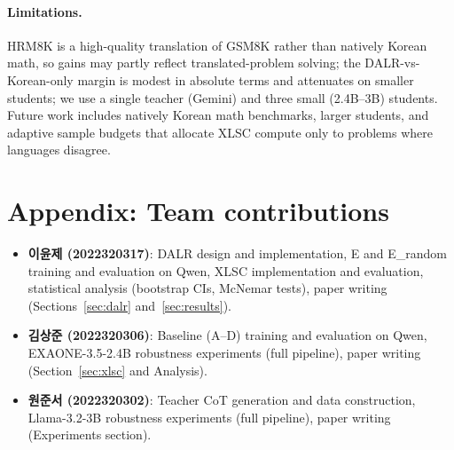 \documentclass{article}
\begin{document}
\paragraph{Limitations.} HRM8K is a high-quality translation of
GSM8K rather than natively Korean math, so gains may partly reflect
translated-problem solving; the DALR-vs-Korean-only margin is
modest in absolute terms and attenuates on smaller students; we use
a single teacher (Gemini) and three small (2.4B--3B) students.
Future work includes natively Korean math benchmarks, larger
students, and adaptive sample budgets that allocate XLSC compute
only to problems where languages disagree.




\newpage
\appendix

\section*{Appendix: Team contributions}
\begin{itemize}
  \item \textbf{이윤제 (2022320317)}: DALR design and implementation,
  E and E\_random training and evaluation on Qwen, XLSC implementation
  and evaluation, statistical analysis (bootstrap CIs, McNemar tests),
  paper writing (Sections~\ref{sec:dalr} and~\ref{sec:results}).
  \item \textbf{김상준 (2022320306)}: Baseline (A--D) training and
  evaluation on Qwen, EXAONE-3.5-2.4B robustness experiments (full
  pipeline), paper writing (Section~\ref{sec:xlsc} and Analysis).
  \item \textbf{원준서 (2022320302)}: Teacher CoT generation and data
  construction, Llama-3.2-3B robustness experiments (full pipeline),
  paper writing (Experiments section).
\end{itemize}
\end{document}
